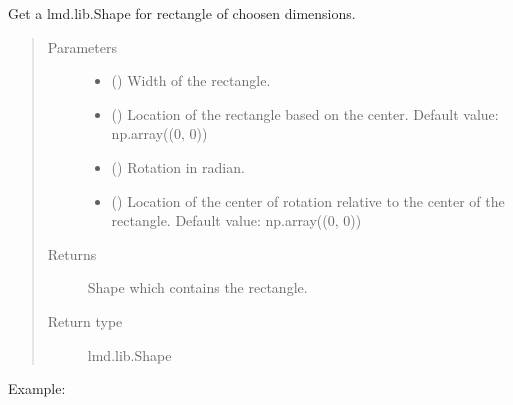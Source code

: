 \documentclass[a4paper,10pt,english,openany,oneside]{sphinxmanual}
\begin{document}
\begin{fulllineitems}
\label{\detokenize{pages/modules:lmd.tools.rectangle}}
\sphinxAtStartPar
Get a lmd.lib.Shape for rectangle of choosen dimensions.
\begin{quote}\begin{description}
\item[{Parameters}] \leavevmode\begin{itemize}
\item {} 
\sphinxAtStartPar
{} () \textendash{} Width of the rectangle.

\item {} 
\sphinxAtStartPar
{} () \textendash{} Location of the rectangle based on the center. Default value: np.array((0, 0))

\item {} 
\sphinxAtStartPar
{} () \textendash{} Rotation in radian.

\item {} 
\sphinxAtStartPar
{} () \textendash{} Location of the center of rotation relative to the center of the rectangle. Default value: np.array((0, 0))

\end{itemize}

\item[{Returns}] \leavevmode
\sphinxAtStartPar
Shape which contains the rectangle.

\item[{Return type}] \leavevmode
\sphinxAtStartPar
lmd.lib.Shape

\end{description}\end{quote}

\sphinxAtStartPar
Example:

\end{fulllineitems}
\end{document}
